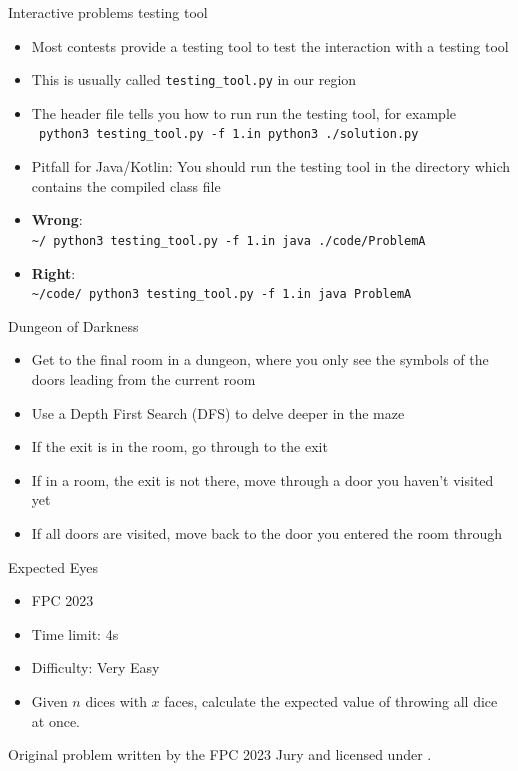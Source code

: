 \documentclass[11pt,pdf, aspectratio=169]{beamer}
\begin{document}
  \begin{frame}{Interactive problems testing tool}
    \begin{itemize}
      \item Most contests provide a testing tool to test the interaction with a testing tool
      \item This is usually called \texttt{testing\_tool.py} in our region
      \item The header file tells you how to run run the testing tool, for example\\\texttt{\textdollar{} python3 testing\_tool.py -f 1.in python3 ./solution.py}
      \item Pitfall for Java/Kotlin: You should run the testing tool in the directory which contains the compiled class file

      \item \textbf{Wrong}:\\\texttt{\textasciitilde/\textdollar{} python3 testing\_tool.py -f 1.in java ./code/ProblemA}
      \item \textbf{Right}:\\\texttt{\textasciitilde/code/\textdollar{} python3 testing\_tool.py -f 1.in java ProblemA}
    \end{itemize}
  \end{frame}
  \begin{frame}{Dungeon of Darkness}
    \begin{itemize}
      \item<1-> Get to the final room in a dungeon, where you only see the symbols of the doors leading from the current room
      \item<2-> Use a Depth First Search (DFS) to delve deeper in the maze
      \item<3-> If the exit is in the room, go through to the exit
      \item<3-> If in a room, the exit is not there, move through a door you haven't visited yet
      \item<3-> If all doors are visited, move back to the door you entered the room through
    \end{itemize}
  \end{frame}
  \begin{frame}{Expected Eyes}
    \begin{itemize}
      \item FPC 2023
      \item Time limit: 4s
      \item Difficulty: Very Easy
      \item Given $n$ dices with $x$ faces, calculate the expected value of throwing all dice at once.
    \end{itemize}
    Original problem written by the FPC 2023 Jury and licensed under \doclicenseLongNameRef.

    \doclicenseImage

  \end{frame}
\end{document}
